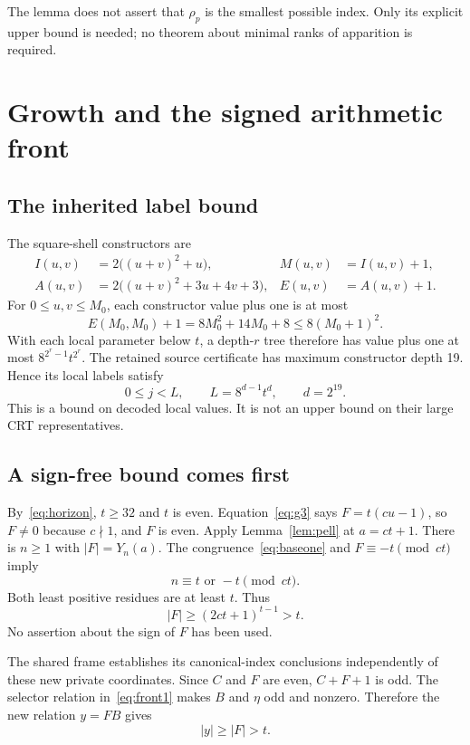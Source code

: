 \documentclass[11pt]{article}
\theoremstyle{definition}
\theoremstyle{remark}
\begin{document}
The lemma does not assert that $\rho_p$ is the smallest possible index.
Only its explicit upper bound is needed; no theorem about minimal ranks of
apparition is required.

\section{Growth and the signed arithmetic front}\label{sec:soundness}

\subsection{The inherited label bound}

The square-shell constructors are
\begin{align*}
 I(u,v)&=2\bigl((u+v)^2+u\bigr),& M(u,v)&=I(u,v)+1,\\
 A(u,v)&=2\bigl((u+v)^2+3u+4v+3\bigr),& E(u,v)&=A(u,v)+1.
\end{align*}
For $0\le u,v\le M_0$, each constructor value plus one is at most
\[
 E(M_0,M_0)+1=8M_0^2+14M_0+8\le8(M_0+1)^2.
\]
With each local parameter below $t$, a depth-$r$ tree therefore has value
plus one at most $8^{2^r-1}t^{2^r}$. The retained source certificate has
maximum constructor depth 19. Hence its local labels satisfy
\begin{equation}\label{eq:labelbound}
 0\le j<L,\qquad L=8^{d-1}t^d,\qquad d=2^{19}.
\end{equation}
This is a bound on decoded local values. It is not an upper bound on their
large CRT representatives.

\subsection{A sign-free bound comes first}

By~\eqref{eq:horizon}, $t\ge32$ and $t$ is even. Equation~\eqref{eq:g3}
says $F=t(cu-1)$, so $F\ne0$ because $c\nmid1$, and $F$ is even.
Apply Lemma~\ref{lem:pell} at $a=ct+1$. There is $n\ge1$ with
$|F|=Y_n(a)$. The congruence~\eqref{eq:baseone} and
$F\equiv-t\pmod{ct}$ imply
\[
 n\equiv t\text{ or }-t\pmod{ct}.
\]
Both least positive residues are at least $t$. Thus
\begin{equation}\label{eq:weakgrowth}
 |F|\ge(2ct+1)^{t-1}>t.
\end{equation}
No assertion about the sign of $F$ has been used.

The shared frame establishes its canonical-index conclusions independently
of these new private coordinates. Since $C$ and $F$ are even,
$C+F+1$ is odd. The selector relation in~\eqref{eq:front1} makes $B$
and $\eta$ odd and nonzero. Therefore the new relation $y=FB$ gives
\begin{equation}\label{eq:weakspacing}
 |y|\ge|F|>t.
\end{equation}
\end{document}
